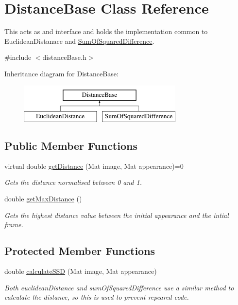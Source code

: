 \hypertarget{class_distance_base}{}\section{Distance\+Base Class Reference}
\label{class_distance_base}


This acts as and interface and holds the implementation common to Euclidean\+Distanace and \hyperlink{class_sum_of_squared_difference}{Sum\+Of\+Squared\+Difference}.  




{\ttfamily \#include $<$distance\+Base.\+h$>$}

Inheritance diagram for Distance\+Base\+:\begin{figure}[H]
\begin{center}
\leavevmode
\includegraphics[height=2.000000cm]{class_distance_base}
\end{center}
\end{figure}
\subsection*{Public Member Functions}
\begin{DoxyCompactItemize}
\item 
virtual double \hyperlink{class_distance_base_aafc76227a800dd0827bedefded215646}{get\+Distance} (Mat image, Mat appearance)=0
\begin{DoxyCompactList}\small\item\em Gets the distance normalised between 0 and 1. \end{DoxyCompactList}\item 
double \hyperlink{class_distance_base_af22d9248a5ac76c62b7f0dbe5ee99251}{get\+Max\+Distance} ()
\begin{DoxyCompactList}\small\item\em Gets the highest distance value between the initial appearance and the intial frame. \end{DoxyCompactList}\end{DoxyCompactItemize}
\subsection*{Protected Member Functions}
\begin{DoxyCompactItemize}
\item 
double \hyperlink{class_distance_base_aa98d8e96cd683f814d9a8b6e5ad93836}{calculate\+S\+S\+D} (Mat image, Mat appearance)
\begin{DoxyCompactList}\small\item\em Both euclidean\+Distance and sum\+Of\+Squared\+Difference use a similar method to calculate the distance, so this is used to prevent repeared code. \end{DoxyCompactList}\end{DoxyCompactItemize}
